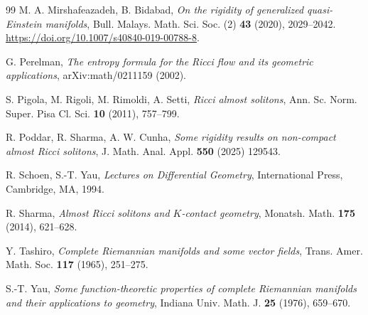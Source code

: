 \documentclass[12pt,a4paper]{article}
\theoremstyle{definition}
\theoremstyle{definition}
\begin{document}
\begin{thebibliography}{99}
 M. A. Mirshafeazadeh, B. Bidabad, \textit{On the rigidity of generalized quasi-Einstein manifolds}, Bull. Malays. Math. Sci. Soc. (2) \textbf{43} (2020), 2029--2042. \url{https://doi.org/10.1007/s40840-019-00788-8}.

 G. Perelman, \textit{The entropy formula for the Ricci flow and its geometric applications}, arXiv:math/0211159 (2002).

 S. Pigola, M. Rigoli, M. Rimoldi, A. Setti, \textit{Ricci almost solitons}, Ann. Sc. Norm. Super. Pisa Cl. Sci. \textbf{10} (2011), 757--799.

 R. Poddar, R. Sharma, A. W. Cunha, \textit{Some rigidity results on non-compact almost Ricci solitons}, J. Math. Anal. Appl. \textbf{550} (2025) 129543.

 R. Schoen, S.-T. Yau, \textit{Lectures on Differential Geometry}, International Press, Cambridge, MA, 1994.

 R. Sharma, \textit{Almost Ricci solitons and $K$-contact geometry}, Monatsh. Math. \textbf{175} (2014), 621--628.

 Y. Tashiro, \textit{Complete Riemannian manifolds and some vector fields}, Trans. Amer. Math. Soc. \textbf{117} (1965), 251--275.

 S.-T. Yau, \textit{Some function-theoretic properties of complete Riemannian manifolds and their applications to geometry}, Indiana Univ. Math. J. \textbf{25} (1976), 659--670.

\end{thebibliography}
\end{document}
